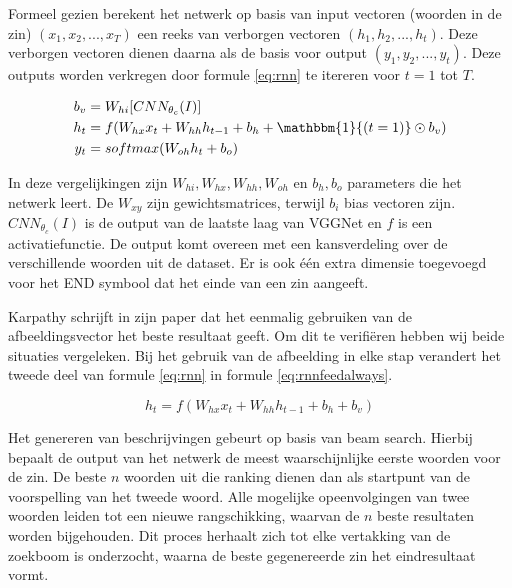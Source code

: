 Formeel gezien berekent het netwerk op basis van input vectoren (woorden in de zin) $(x_1,x_2,...,x_T)$ een reeks van verborgen vectoren $(h_1,h_2,...,h_t)$. Deze verborgen vectoren dienen daarna als de basis voor output $(y_1,y_2,...,y_t)$. Deze outputs worden verkregen door formule \eqref{eq:rnn} te itereren voor $t = 1$ tot $T$.

\begin{equation}
\begin{aligned}
     b_v &= W_{hi} [CNN_{\theta_c}(I)] \\
     h_t &= f(W_{hx} x_{t} + W_{hh} h_{t-1} + b_h + \mathbbm{1}{(t=1)} \odot b_v) \\
     y_t &= softmax( W_{oh} h_t + b_o)
\end{aligned}
\label{eq:rnn}
\end{equation}

In deze vergelijkingen zijn $W_{hi}, W_{hx}, W_{hh}, W_{oh}$ en $b_h, b_o$ parameters die het netwerk leert. De $W_{xy}$ zijn gewichtsmatrices, terwijl $b_i$ bias vectoren zijn. $CNN_{\theta_c}(I)$ is de output van de laatste laag van VGGNet en $f$ is een activatiefunctie. De output komt overeen met een kansverdeling over de verschillende woorden uit de dataset. Er is ook \'e\'en extra dimensie toegevoegd voor het END symbool dat het einde van een zin aangeeft. 

Karpathy schrijft in zijn paper dat het eenmalig gebruiken van de afbeeldingsvector het beste resultaat geeft. Om dit te verifi\"eren hebben wij beide situaties vergeleken. Bij het gebruik van de afbeelding in elke stap verandert het tweede deel van formule \eqref{eq:rnn} in formule \eqref{eq:rnnfeedalways}.

\begin{equation}
     h_t = f(W_{hx} x_{t} + W_{hh} h_{t-1} + b_h + b_v)
\label{eq:rnnfeedalways}
\end{equation}

Het genereren van beschrijvingen gebeurt op basis van beam search. Hierbij bepaalt de output van het netwerk de meest waarschijnlijke eerste woorden voor de zin. De beste $n$ woorden uit die ranking dienen dan als startpunt van de voorspelling van het tweede woord. Alle mogelijke opeenvolgingen van twee woorden leiden tot een nieuwe rangschikking, waarvan de $n$ beste resultaten worden bijgehouden. Dit proces herhaalt zich tot elke vertakking van de zoekboom is onderzocht, waarna de beste gegenereerde zin het eindresultaat vormt. 

